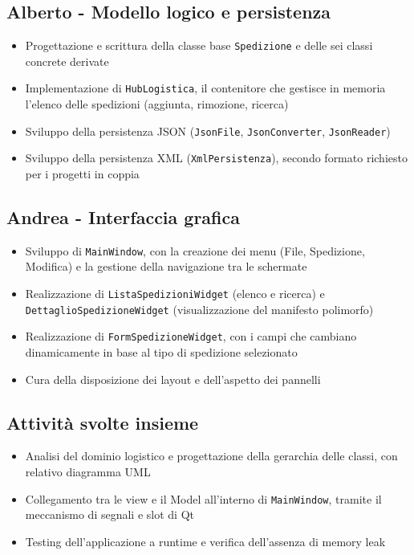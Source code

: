 \documentclass[10pt,a4paper]{article}
\begin{document}
\subsection*{Alberto - Modello logico e persistenza}
\begin{itemize}
  \item Progettazione e scrittura della classe base \texttt{Spedizione} e delle sei classi concrete derivate
  \item Implementazione di \texttt{HubLogistica}, il contenitore che gestisce in memoria l'elenco delle spedizioni (aggiunta, rimozione, ricerca)
  \item Sviluppo della persistenza JSON (\texttt{JsonFile}, \texttt{JsonConverter}, \texttt{JsonReader})
  \item Sviluppo della persistenza XML (\texttt{XmlPersistenza}), secondo formato richiesto per i progetti in coppia
\end{itemize}

\subsection*{Andrea - Interfaccia grafica}
\begin{itemize}
  \item Sviluppo di \texttt{MainWindow}, con la creazione dei menu (File, Spedizione, Modifica) e la gestione della navigazione tra le schermate
  \item Realizzazione di \texttt{ListaSpedizioniWidget} (elenco e ricerca) e \texttt{DettaglioSpedizioneWidget} (visualizzazione del manifesto polimorfo)
  \item Realizzazione di \texttt{FormSpedizioneWidget}, con i campi che cambiano dinamicamente in base al tipo di spedizione selezionato
  \item Cura della disposizione dei layout e dell'aspetto dei pannelli
\end{itemize}

\subsection*{Attività svolte insieme}
\begin{itemize}
  \item Analisi del dominio logistico e progettazione della gerarchia delle classi, con relativo diagramma UML
  \item Collegamento tra le view e il Model all'interno di \texttt{MainWindow}, tramite il meccanismo di segnali e slot di Qt
  \item Testing dell'applicazione a runtime e verifica dell'assenza di memory leak
\end{itemize}
\end{document}
